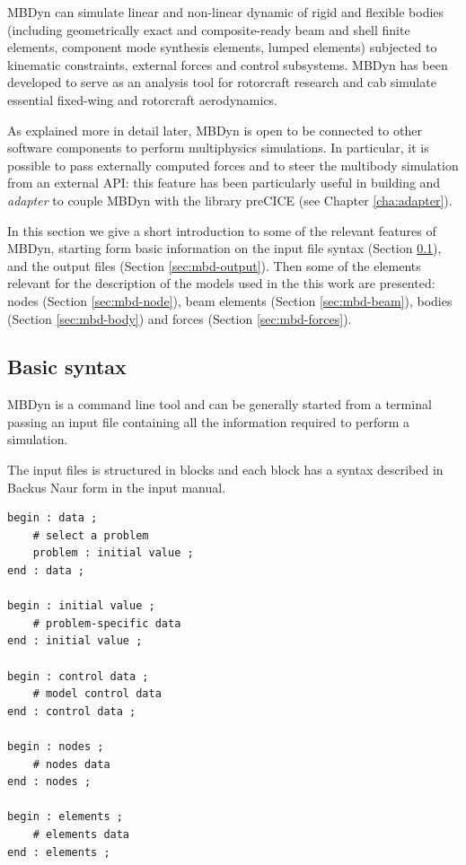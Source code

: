 MBDyn can simulate linear and non-linear dynamic of rigid and flexible bodies (including geometrically exact and composite-ready beam and shell finite elements, component mode synthesis elements, lumped elements) subjected to kinematic constraints, external forces and control subsystems\cite{masarati2014efficient}. 
MBDyn has been developed to serve as an analysis tool for rotorcraft research and cab simulate essential fixed-wing and rotorcraft aerodynamics.

As explained more in detail later, MBDyn is open to be connected to other software components to perform multiphysics simulations. In particular, it is possible to pass externally computed forces  and to steer the multibody simulation from an external API: this feature has been particularly useful in building and \textit{adapter} to couple MBDyn with the library preCICE (see Chapter \ref{cha:adapter}).

In this section we give a short introduction to some of the relevant features of MBDyn, starting form basic information on the input file syntax (Section \ref{sec:mbd-syntax}), and the output files (Section \ref{sec:mbd-output}). Then some of the elements relevant for the description of the models used in the this work are presented: nodes (Section \ref{sec:mbd-node}), beam elements (Section \ref{sec:mbd-beam}), bodies (Section \ref{sec:mbd-body}) and forces (Section \ref{sec:mbd-forces}). 


\subsection{Basic syntax}
\label{sec:mbd-syntax}

MBDyn is a command line tool and can be generally started from a terminal passing an input file containing all the information required to perform a simulation. 

The input files is structured in blocks and each block has a syntax described in Backus Naur form in the input manual.

\lstset{language=mbdyn}
\begin{lstlisting}[caption=MBDyn input file structure,label=lst:mbd-struct]
begin : data ;
    # select a problem
    problem : initial value ;
end : data ;

begin : initial value ;
    # problem-specific data
end : initial value ;

begin : control data ;
    # model control data
end : control data ;

begin : nodes ;
    # nodes data
end : nodes ;

begin : elements ;
    # elements data
end : elements ;
\end{lstlisting}

